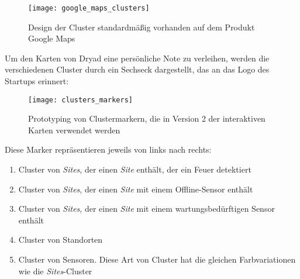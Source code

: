 \begin{figure}[H]
  \centering
  \texttt{[image: google\_maps\_clusters]}
  \caption{Design der Cluster standardmäßig vorhanden auf dem Produkt Google Maps}
  \label{fig:google_maps_clusters}
\end{figure}

Um den Karten von Dryad eine persönliche Note zu verleihen, werden die verschiedenen Cluster durch ein Sechseck dargestellt, das an das Logo des Startups erinnert:

\begin{figure}[H]
  \centering
  \texttt{[image: clusters\_markers]}
  \caption{Prototyping von Clustermarkern, die in Version 2 der interaktiven Karten verwendet werden}
  \label{fig:clusters_markers}
\end{figure}

Diese Marker repräsentieren jeweils von links nach rechts:

\begin{enumerate}
  \item Cluster von \textit{Sites}, der einen \textit{Site} enthält, der ein Feuer detektiert
  \item Cluster von \textit{Sites}, der einen \textit{Site} mit einem Offline-Sensor enthält
  \item Cluster von \textit{Sites}, der einen \textit{Site} mit einem wartungsbedürftigen Sensor enthält
  \item Cluster von Standorten
  \item Cluster von Sensoren. Diese Art von Cluster hat die gleichen Farbvariationen wie die \textit{Sites}-Cluster
\end{enumerate}
